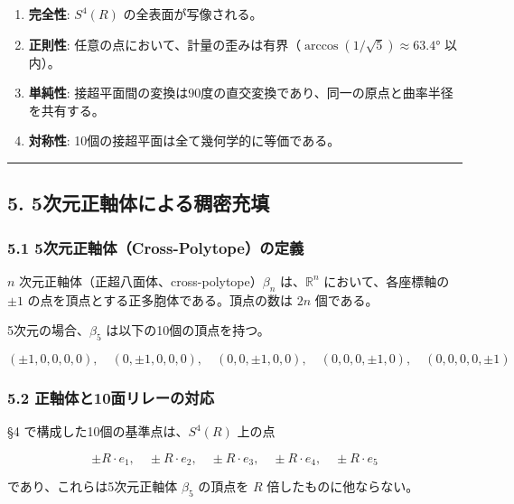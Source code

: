 \documentclass[a4paper,11pt]{ltjsarticle}
\providecommand{\tightlist}{\setlength{\itemsep}{0pt}\setlength{\parskip}{0pt}}
\begin{document}
\begin{enumerate}
\def\labelenumi{\arabic{enumi}.}
\tightlist
\item
  \textbf{完全性}: \(S^4(R)\) の全表面が写像される。
\item
  \textbf{正則性}:
  任意の点において、計量の歪みは有界（\(\arccos(1/\sqrt{5}) \approx 63.4°\)
  以内）。
\item
  \textbf{単純性}:
  接超平面間の変換は90度の直交変換であり、同一の原点と曲率半径を共有する。
\item
  \textbf{対称性}: 10個の接超平面は全て幾何学的に等価である。
\end{enumerate}

\begin{center}\rule{0.5\linewidth}{0.5pt}\end{center}

\subsection{5.
5次元正軸体による稠密充填}\label{ux6b21ux5143ux6b63ux8ef8ux4f53ux306bux3088ux308bux7a20ux5bc6ux5145ux586b}

\subsubsection{5.1
5次元正軸体（Cross-Polytope）の定義}\label{ux6b21ux5143ux6b63ux8ef8ux4f53cross-polytopeux306eux5b9aux7fa9}

\(n\) 次元正軸体（正超八面体、cross-polytope）\(\beta_n\)
は、\(\mathbb{R}^n\) において、各座標軸の \(\pm 1\)
の点を頂点とする正多胞体である。頂点の数は \(2n\) 個である。

5次元の場合、\(\beta_5\) は以下の10個の頂点を持つ。

\[(\pm 1, 0, 0, 0, 0), \quad (0, \pm 1, 0, 0, 0), \quad (0, 0, \pm 1, 0, 0), \quad (0, 0, 0, \pm 1, 0), \quad (0, 0, 0, 0, \pm 1)\]

\subsubsection{5.2
正軸体と10面リレーの対応}\label{ux6b63ux8ef8ux4f53ux306810ux9762ux30eaux30ecux30fcux306eux5bfeux5fdc}

§4 で構成した10個の基準点は、\(S^4(R)\) 上の点

\[\pm R \cdot e_1, \quad \pm R \cdot e_2, \quad \pm R \cdot e_3, \quad \pm R \cdot e_4, \quad \pm R \cdot e_5\]

であり、これらは5次元正軸体 \(\beta_5\) の頂点を \(R\)
倍したものに他ならない。
\end{document}
